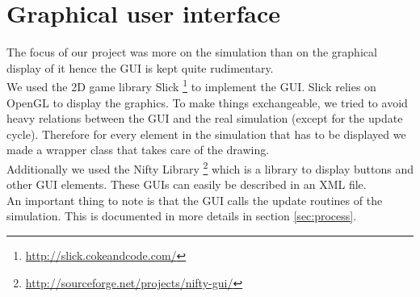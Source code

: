 
\section{Graphical user interface}
\label{sec:gui}

The focus of our project was more on the simulation than on the graphical 
display of it hence the GUI is kept quite rudimentary. \\

\noindent We used the 2D game library Slick
\footnote{\href{http://slick.cokeandcode.com/}{http://slick.cokeandcode.com/}}
to implement the GUI. Slick relies on OpenGL to display the graphics.
To make things exchangeable, we tried to avoid heavy relations between
the GUI and the real simulation (except for the update cycle).  Therefore
for every element in the simulation that has to be displayed we made a
wrapper class that takes care of the drawing. \\

\noindent Additionally we used the Nifty Library
\footnote{\href{http://sourceforge.net/projects/nifty-gui/}
{http://sourceforge.net/projects/nifty-gui/}} which is a library to
display buttons and other GUI elements. These GUIs can easily be described
in an XML file. \\

\noindent An important thing to note is that the GUI calls the update routines of the
simulation. This is documented in more details in section \ref{sec:process}.

